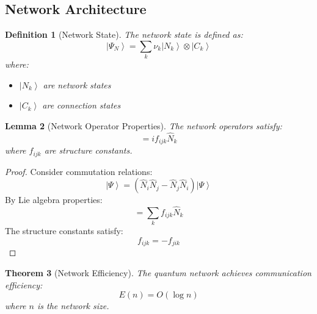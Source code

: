 \documentclass[12pt]{article}
\newcommand{\ket}[1]{\left|#1\right\rangle}
\newcommand{\op}[1]{\hat{#1}}
\newtheorem{theorem}{Theorem}[section]
\newtheorem{lemma}[theorem]{Lemma}
\newtheorem{definition}[theorem]{Definition}
\begin{document}
\subsection{Network Architecture}
\begin{definition}[Network State]
The network state is defined as:
\begin{equation}
\ket{\Psi_N} = \sum_k \nu_k\ket{N_k} \otimes \ket{C_k}
\end{equation}
where:
\begin{itemize}
\item $\ket{N_k}$ are network states
\item $\ket{C_k}$ are connection states
\end{itemize}
\end{definition}
\begin{lemma}[Network Operator Properties]
The network operators satisfy:
\begin{equation}
[\op{N}_i,\op{N}_j] = if_{ijk}\op{N}_k
\end{equation}
where $f_{ijk}$ are structure constants.
\end{lemma}
\begin{proof}
Consider commutation relations:
\begin{equation}
[\op{N}_i,\op{N}_j]\ket{\Psi} = (\op{N}_i\op{N}_j - \op{N}_j\op{N}_i)\ket{\Psi}
\end{equation}
By Lie algebra properties:
\begin{equation}
[\op{N}_i,\op{N}_j] = \sum_k f_{ijk}\op{N}_k
\end{equation}
The structure constants satisfy:
\begin{equation}
f_{ijk} = -f_{jik}
\end{equation}
\end{proof}
\begin{theorem}[Network Efficiency]
The quantum network achieves communication efficiency:
\begin{equation}
E(n) = O(\log n)
\end{equation}
where $n$ is the network size.
\end{theorem}
\end{document}
